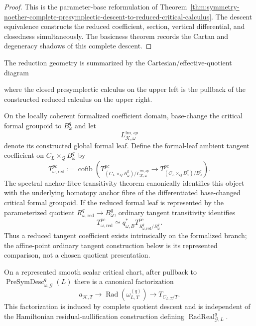 \begin{proof}
This is the parameter-base reformulation of
Theorem~\ref{thm:symmetry-noether-complete-presymplectic-descent-to-reduced-critical-calculus}.
The descent equivalence constructs the reduced coefficient, section, vertical
differential, and closedness simultaneously.  The basicness theorem records the
Cartan and degeneracy shadows of this complete descent.
\end{proof}


The reduction geometry is summarized by the Cartesian/effective-quotient diagram
where the closed presymplectic calculus on the upper left is the pullback of the
constructed reduced calculus on the upper right.

\begin{construction}
\label{constr:symmetry-noether-intrinsic-formal-leaf-reduced-tangent-coefficient}
On the locally coherent formalized coefficient domain, base-change the critical
formal groupoid to $B_\omega^q$ and let
\[
L_{\mathcal K,\omega}^{\mathrm{fm},sp}
\]
denote its constructed global formal leaf.  Define the formal-leaf ambient tangent
coefficient on $C_L\times_QB_\omega^q$ by
\[
\boxed{
T_{\omega,\mathrm{red}}^{pc}
:=
\operatorname{cofib}
\left(
T^{pc}_{(C_L\times_QB_\omega^q)/L_{\mathcal K,\omega}^{\mathrm{fm},sp}}
\longrightarrow
T^{pc}_{(C_L\times_QB_\omega^q)/B_\omega^q}
\right).
}
\]
The spectral anchor-fibre transitivity theorem canonically identifies this object
with the underlying homotopy anchor fibre of the differentiated base-changed
critical formal groupoid.  If the reduced formal leaf is represented by the
parameterized quotient $R_{\omega,\mathrm{red}}^q\to B_\omega^q$, ordinary tangent
transitivity identifies
\[
T_{\omega,\mathrm{red}}^{pc}
\simeq
q_{\omega,B}^*T^{pc}_{R_{\omega,\mathrm{red}}^q/B_\omega^q}.
\]
Thus a reduced tangent coefficient exists intrinsically on the formalized branch;
the affine-point ordinary tangent construction below is its represented
comparison, not a chosen quotient presentation.
\end{construction}


\begin{theorem}
\label{thm:symmetry-noether-presymplectic-descent-forces-critical-symmetry-radical}
On a represented smooth scalar critical chart, after pullback to
$\operatorname{PreSymDesc}_{\omega,\mathcal G}^{q}(L)$ there is a canonical
factorization
\[
\boxed{
a_{\mathcal K,T}
\longrightarrow
\operatorname{Rad}(\omega_{L,T}^{(q)})
\longrightarrow
T_{C_{L,T}/T}.
}
\]
This factorization is induced by complete quotient descent and is independent of the
Hamiltonian residual-nullification construction defining
$\operatorname{RadReal}_{\mathcal G,L}^{q}$.
\end{theorem}

